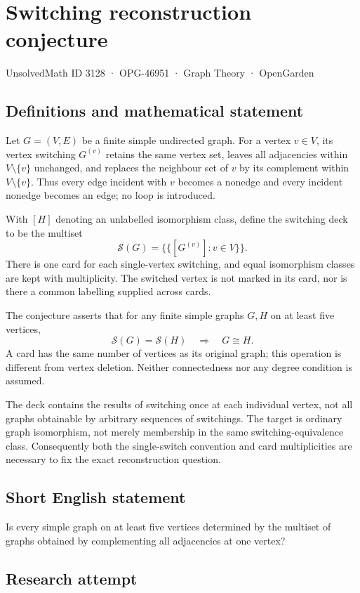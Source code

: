 \documentclass[11pt,a4paper]{article}
\begin{document}
\section*{Switching reconstruction conjecture}\label{3128}
{\small UnsolvedMath ID 3128 · OPG-46951 · Graph Theory · OpenGarden}
\subsection{Definitions and mathematical statement}
Let $G=(V,E)$ be a finite simple undirected graph. For a vertex $v\in V$,
its vertex switching $G^{(v)}$ retains the same vertex set, leaves all
adjacencies within $V\setminus\{v\}$ unchanged, and replaces the neighbour
set of $v$ by its complement within $V\setminus\{v\}$. Thus every edge
incident with $v$ becomes a nonedge and every incident nonedge becomes
an edge; no loop is introduced.

With $[H]$ denoting an unlabelled isomorphism class, define the switching
deck to be the multiset
\[
 \mathcal S(G)=\{\!\{[G^{(v)}]:v\in V\}\!\}.
\]
There is one card for each single-vertex switching, and equal isomorphism
classes are kept with multiplicity. The switched vertex is not marked
in its card, nor is there a common labelling supplied across cards.

The conjecture asserts that for any finite simple graphs $G,H$ on
at least five vertices,
\[
 \mathcal S(G)=\mathcal S(H)\quad\Longrightarrow\quad G\cong H.
\]
A card has the same number of vertices as its original graph; this
operation is different from vertex deletion. Neither connectedness nor
any degree condition is assumed.

The deck contains the results of switching once at each individual
vertex, not all graphs obtainable by arbitrary sequences of switchings.
The target is ordinary graph isomorphism, not merely membership in the
same switching-equivalence class. Consequently both the single-switch
convention and card multiplicities are necessary to fix the exact
reconstruction question.
\subsection{Short English statement}
Is every simple graph on at least five vertices determined by the multiset of graphs obtained by complementing all adjacencies at one vertex?
\subsection{Research attempt}
\end{document}
